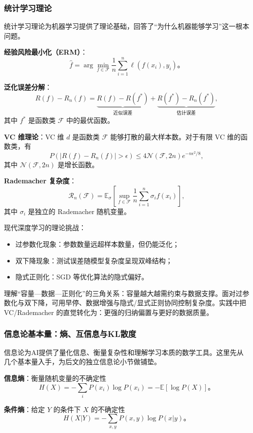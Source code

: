 \subsubsection{统计学习理论}

统计学习理论为机器学习提供了理论基础，回答了“为什么机器能够学习”这一根本问题。

\textbf{经验风险最小化（ERM）}：
$$
\hat{f} = \arg\min_{f \in \mathcal{F}} \frac{1}{n}\sum_{i=1}^n \ell(f(x_i), y_i)。
$$

\textbf{泛化误差分解}：
$$
R(f) - R_n(f) = \underbrace{R(f) - R(f^*)}_{\text{近似误差}} + \underbrace{R(f^*) - R_n(f^*)}_{\text{估计误差}},
$$
其中 $f^*$ 是函数类 $\mathcal{F}$ 中的最优函数。

\textbf{VC 维理论}：VC 维 $d$ 是函数类 $\mathcal{F}$ 能够打散的最大样本数。对于有限 VC 维的函数类，有
$$
P\left(|R(f) - R_n(f)| > \epsilon\right) \leq 4\mathcal{N}(\mathcal{F}, 2n)e^{-n\epsilon^2/8},
$$
其中 $\mathcal{N}(\mathcal{F}, 2n)$ 是增长函数。

\textbf{Rademacher 复杂度}：
$$
\mathcal{R}_n(\mathcal{F}) = \mathbb{E}_{\sigma}\left[\sup_{f \in \mathcal{F}} \frac{1}{n}\sum_{i=1}^n \sigma_i f(x_i)\right],
$$
其中 $\sigma_i$ 是独立的 Rademacher 随机变量。

现代深度学习的理论挑战：
\begin{itemize}
  \item 过参数化现象：参数数量远超样本数量，但仍能泛化；
  \item 双下降现象：测试误差随模型复杂度呈现双峰结构；
  \item 隐式正则化：SGD 等优化算法的隐式偏好。
\end{itemize}

理解“容量—数据—正则化”的三角关系：容量越大越需约束与数据支撑。面对过参数化与双下降，可用早停、数据增强与隐式/显式正则协同控制复杂度。实践中把 VC/Rademacher 的直觉转化为：更强的归纳偏置与更好的数据质量。

\subsubsection{信息论基本量：熵、互信息与KL散度}

信息论为AI提供了量化信息、衡量复杂性和理解学习本质的数学工具。这里先从几个基本量入手，为后文的独立信息论小节做铺垫。

\textbf{信息熵}：衡量随机变量的不确定性
$$
H(X) = -\sum_{i} P(x_i) \log P(x_i) = -\mathbb{E}[\log P(X)]。
$$

\textbf{条件熵}：给定 $Y$ 的条件下 $X$ 的不确定性
$$
H(X|Y) = -\sum_{x,y} P(x,y) \log P(x|y)。
$$

